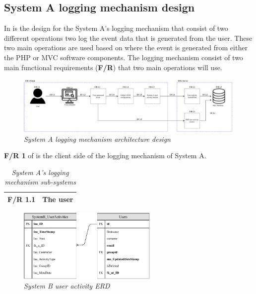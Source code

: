 \subsection{System A logging mechanism design}

In  is the design for the System A's logging mechanism that consist of two different operations two log the event data that is generated from the user. These two main operations are used based on where the event is generated from either the PHP or MVC software components. The logging mechanism consist of two main functional requirements (\textbf{F/R}) that two main operations will use.

\begin{figure}[!htb] %
	\centering %
	\includegraphics[width=0.99\textwidth]{Images/Chapter2/SystemA_Architecture_Diagram/SystemA_Architecture_Diagram.pdf}
	\caption[System A logging mechanism architecture design]
	{\textit{System A logging mechanism architecture design}}\label{fig:SystemA_Arch_Design}
\end{figure}

\textbf{F/R 1} of  is the client side of the logging mechanism of System A.

\begin{table}[!htb]
	\centering
	\small
	\caption[System A's logging mechanism sub-systems]
	{\textit{System A's logging mechanism sub-systems}}
	\label{tbl:SystemA_SubSystems}
	\begin{tabularx}{\textwidth}{|l|X|}
		\hline \textbf{F/R 1.1} & The user \\
		\hline
	\end{tabularx}
\end{table}

\clearpage

\begin{figure}[!htb] %
	\centering %
	\includegraphics[width=0.6\textwidth]{Images/Chapter2/SystemB_ERD_Basic/SystemB_ERD_Basic.pdf}
	\caption[System B user activity ERD]
	{\textit{System B user activity ERD}}\label{fig:SystemB_Basic_ERD}
\end{figure}

